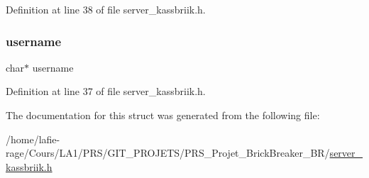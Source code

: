 Definition at line 38 of file server\+\_\+kassbriik.\+h.

\mbox{\label{structclient_a9b20c006bd90a09e1465fb668700e81d}} 
\subsubsection{\texorpdfstring{username}{username}}
{\footnotesize\ttfamily char$\ast$ username}



Definition at line 37 of file server\+\_\+kassbriik.\+h.



The documentation for this struct was generated from the following file\+:\begin{DoxyCompactItemize}
\item 
/home/lafie-\/rage/\+Cours/\+L\+A1/\+P\+R\+S/\+G\+I\+T\+\_\+\+P\+R\+O\+J\+E\+T\+S/\+P\+R\+S\+\_\+\+Projet\+\_\+\+Brick\+Breaker\+\_\+\+B\+R/\hyperlink{server__kassbriik_8h}{server\+\_\+kassbriik.\+h}\end{DoxyCompactItemize}
